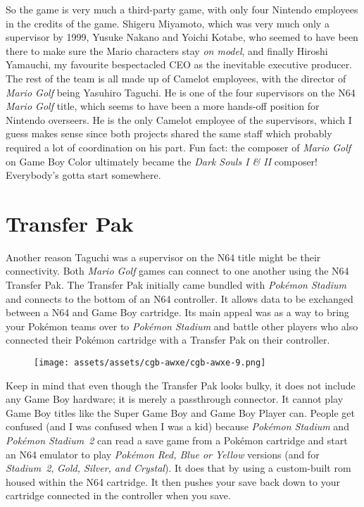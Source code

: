 \documentclass{book}
\begin{document}
So the game is very much a third-party game, with only four Nintendo employees in the credits of the game. Shigeru Miyamoto, which was very much only a supervisor by 1999, Yusuke Nakano and Yoichi Kotabe, who seemed to have been there to make sure the Mario characters stay \emph{on model}, and finally Hiroshi Yamauchi, my favourite bespectacled CEO as the inevitable executive producer. The rest of the team is all made up of Camelot employees, with the director of \emph{Mario Golf} being Yasuhiro Taguchi. He is one of the four supervisors on the N64 \emph{Mario Golf} title, which seems to have been a more hands-off position for Nintendo overseers. He is the only Camelot employee of the supervisors, which I guess makes sense since both projects shared the same staff which probably required a lot of coordination on his part. Fun fact: the composer of \emph{Mario Golf} on Game Boy Color ultimately became the \emph{Dark Souls I \& II} composer! Everybody’s gotta start somewhere.

\FloatBarrier\needspace{10mm}\section*{Transfer Pak}\nopagebreak[4]

Another reason Taguchi was a supervisor on the N64 title might be their connectivity. Both \emph{Mario Golf} games can connect to one another using the N64 Transfer Pak. The Transfer Pak initially came bundled with \emph{Pokémon Stadium} and connects to the bottom of an N64 controller. It allows data to be exchanged between a N64 and Game Boy cartridge. Its main appeal was as a way to bring your Pokémon teams over to \emph{Pokémon Stadium} and battle other players who also connected their Pokémon cartridge with a Transfer Pak on their controller.

\begin{figure}[hbt]
\vskip 10pt
\centering \texttt{[image: assets/assets/cgb-awxe/cgb-awxe-9.png]}
\vskip 6pt
\end{figure}

Keep in mind that even though the Transfer Pak looks bulky, it does not include any Game Boy hardware; it is merely a passthrough connector. It cannot play Game Boy titles like the Super Game Boy and Game Boy Player can. People get confused (and I was confused when I was a kid) because \emph{Pokémon Stadium} and \emph{Pokémon Stadium 2} can read a save game from a Pokémon cartridge and start an N64 emulator to play \emph{Pokémon Red, Blue or Yellow} versions (and for \emph{Stadium 2}, \emph{Gold, Silver, and Crystal}). It does that by using a custom-built rom housed within the N64 cartridge. It then pushes your save back down to your cartridge connected in the controller when you save.
\end{document}

